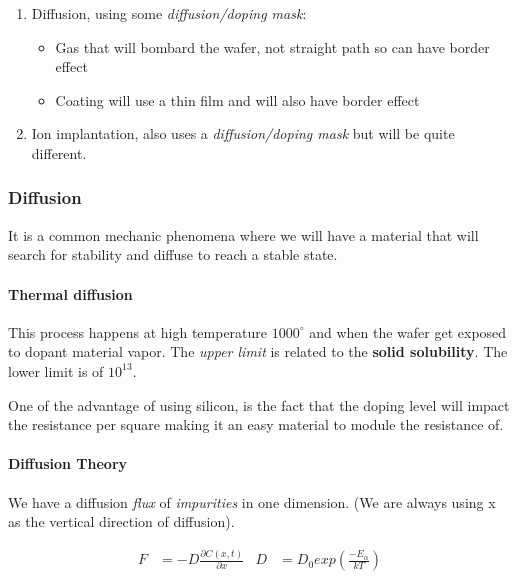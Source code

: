 \documentclass[
]{article}
\begin{document}
\begin{enumerate}
\def\labelenumi{\arabic{enumi}.}
\item
  Diffusion, using some \emph{diffusion/doping mask}:

  \begin{itemize}
  \item
    Gas that will bombard the wafer, not straight path so can have
    border effect
  \item
    Coating will use a thin film and will also have border effect
  \end{itemize}
\item
  Ion implantation, also uses a \emph{diffusion/doping mask} but will be
  quite different.
\end{enumerate}

\hypertarget{diffusion}{%
\subsubsection{Diffusion}\label{diffusion}}

It is a common mechanic phenomena where we will have a material that
will search for stability and diffuse to reach a stable state.

\hypertarget{thermal-diffusion}{%
\paragraph{Thermal diffusion}\label{thermal-diffusion}}

This process happens at high temperature \(1000^\circ\) and when the
wafer get exposed to dopant material vapor. The \emph{upper limit} is
related to the \textbf{solid solubility}. The lower limit is of
\(10^{13}\).

One of the advantage of using silicon, is the fact that the doping level
will impact the resistance per square making it an easy material to
module the resistance of.

\hypertarget{diffusion-theory}{%
\paragraph{Diffusion Theory}\label{diffusion-theory}}

We have a diffusion \emph{flux} of \emph{impurities} in one dimension.
(We are always using x as the vertical direction of diffusion).

\[\begin{aligned}
    F &= - D \frac{\partial C(x,t)}{\partial x} & D &= D_0 exp\left( \frac{-E_{\alpha}}{kT} \right)
\end{aligned}\]
\end{document}
